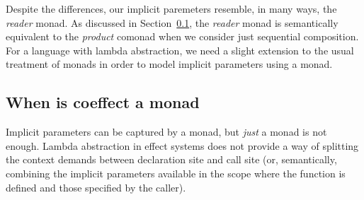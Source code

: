 \noindent
Despite the differences, our implicit paremeters resemble, in many ways, the \emph{reader} monad.
As discussed in Section~\ref{sec:semantics-related-monads}, the \emph{reader} monad is semantically
equivalent to the \emph{product} comonad when we consider just sequential composition. For a
language with lambda abstraction, we need a slight extension to the usual treatment of monads in
order to model implicit parameters using a monad.


\subsection{When is coeffect a monad}
\label{sec:semantics-related-monads}

Implicit parameters can be captured by a monad, but \emph{just} a monad is not enough.
Lambda abstraction in effect systems does not provide a way of splitting the context
demands between declaration site and call site (or, semantically, combining the implicit
parameters available in the scope where the function is defined and those specified by the caller).

